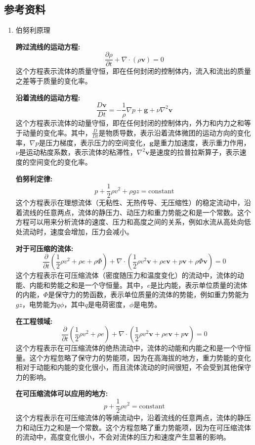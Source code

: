 \documentclass[dvipsnames, svgnames,a4paper,11pt]{article}
\begin{document}
	\subsection{参考资料}
	\begin{enumerate}
		\item 伯努利原理
		
		\textbf{跨过流线的运动方程:}
		\[ \frac{\partial \rho}{\partial t} + \nabla \cdot (\rho \mathbf{v}) = 0 \]
		这个方程表示流体的质量守恒，即在任何封闭的控制体内，流入和流出的质量之差等于质量的变化率。
		
		\textbf{沿着流线的运动方程:}
		\[ \frac{D \mathbf{v}}{D t} = -\frac{1}{\rho} \nabla p + \mathbf{g} + \nu \nabla^2 \mathbf{v} \]
		这个方程表示流体的动量守恒，即在任何封闭的控制体内，外力和内力之和等于动量的变化率。其中，$\frac{D}{D t}$是物质导数，表示沿着流体微团的运动方向的变化率，$\nabla p$是压力梯度，表示压力的空间变化，$\mathbf{g}$是重力加速度，表示重力作用，$\nu$是运动粘度系数，表示流体的粘滞性，$\nabla^2 \mathbf{v}$是速度的拉普拉斯算子，表示速度的空间变化的变化率。
		
		\textbf{伯努利定律:}
		\[ p + \frac{1}{2} \rho v^2 + \rho g z = \text{constant} \]
		这个方程表示在理想流体（无粘性、无热传导、无压缩性）的稳定流动中，沿着流线的任意两点，流体的静压力、动压力和重力势能之和是一个常数。这个方程可以用来分析流体的速度、压力和高度之间的关系，例如水流从高处向低处流动时，速度会增加，压力会减小。
		
		\textbf{对于可压缩的流体:}
		\[ \frac{\partial}{\partial t} \left( \frac{1}{2} \rho v^2 + \rho e + \rho \Phi \right) + \nabla \cdot \left( \frac{1}{2} \rho v^2 \mathbf{v} + \rho e \mathbf{v} + p \mathbf{v} + \rho \Phi \mathbf{v} \right) = 0 \]
		这个方程表示在可压缩流体（密度随压力和温度变化）的流动中，流体的动能、内能和势能之和是一个守恒量。其中，$e$是比内能，表示单位质量的流体的内能，$\Phi$是保守力的势函数，表示单位质量的流体的势能，例如重力势能为$gz$，电势能为$q\phi$，其中$q$是电荷密度，$\phi$是电势。
		
		\textbf{在工程领域:}
		\[ \frac{\partial}{\partial t} \left( \frac{1}{2} \rho v^2 + \rho e \right) + \nabla \cdot \left( \frac{1}{2} \rho v^2 \mathbf{v} + \rho e \mathbf{v} + p \mathbf{v} \right) = 0 \]
		这个方程表示在可压缩流体的绝热流动中，流体的动能和内能之和是一个守恒量。这个方程忽略了保守力的势能项，因为在高海拔的地方，重力势能的变化相对于动能和内能的变化很小，而且流体流动的时间很短，不会受到其他保守力的影响。
		
		\textbf{在可压缩流体可以应用的地方:}
		\[ p + \frac{1}{2} \rho v^2 = \text{constant} \]
		这个方程表示在可压缩流体的等熵流动中，沿着流线的任意两点，流体的静压力和动压力之和是一个常数。这个方程忽略了重力势能项，因为在可压缩流体的流动中，高度变化很小，不会对流体的压力和速度产生显著的影响。
		

\end{enumerate}
\end{document}
